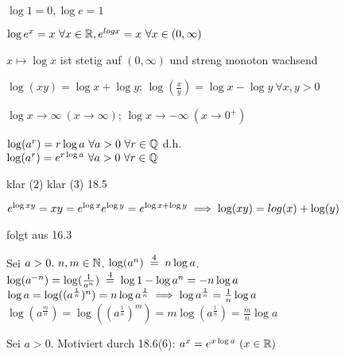 \documentclass[a4paper,twoside,DIV15,BCOR12mm]{scrbook}
\begin{document}
\begin{eigenschaften}


\begin{liste}
\item $\log 1 = 0, \log e = 1$
\item $\log e^x = x\ \forall x \in \mathbb{R}, e^{log x}=x\ \forall x \in (0, \infty)$
\item $x \mapsto \log x$ ist stetig auf $(0, \infty)$ und streng monoton wachsend
\item $\log(xy) = \log x + \log y$; $\log(\frac{x}{y})=\log x - \log y\ \forall x,y > 0$
\item $\log x \to \infty\ (x \to \infty)$; $\log x \to -\infty\ (x \to 0^+)$
\item $\log(a^r) = r \log a\ \forall a > 0\ \forall r \in \MdQ$ d.h.\\
$\log(a^r) = e^{r \log a}\ \forall a > 0\ \forall r \in \MdQ$
\end{liste}

\begin{beweise}
\item klar (2) klar (3) 18.5
\setcounter{enumi}{3}
\item $e^{\log{xy}}=xy = e^{\log x}e^{\log y}=e^{\log x + \log y} \implies \log(xy) = log(x) + \log(y)$
\item folgt aus 16.3
\item Sei $a>0.\ n, m \in \mathbb{N}$. $\log(a^n) \gleichwegen{4} n \log a$. $\log(a^{-n})=\log(\frac{1}{a^n}) \gleichwegen{4} \log 1 - \log a^n = -n \log a$\\
$\log a = \log((a^\frac{1}{n})^n)=n \log a^\frac{1}{n} \implies \log a^\frac{1}{n}=\frac{1}{n} \log a$\\
$\log(a^\frac{m}{n}) = \log((a^{\frac{1}{n}})^m) = m \log(a^{\frac{1}{n}})=\frac{m}{n}\log a$
\end{beweise}

\end{eigenschaften}

\begin{definition}
Sei $a>0$. Motiviert durch 18.6(6): $a^x = e^{x\log a}\ (x\in\MdR)$
\end{definition}
\end{document}
